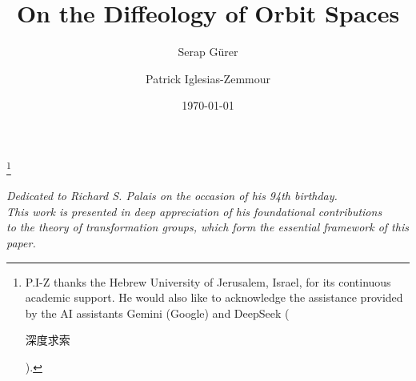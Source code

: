 \documentclass[10pt,reqno,letterpaper,twoside]{amsart}
\theoremstyle{article}
\begin{document}
  
  \title{On the Diffeology of Orbit Spaces}
  
  
  \author{Serap G{\"u}rer}
  \address{Serap G{\"u}rer,
  Galatasaray University,
  Ortaköy, Çırağan Cd. No:$36$,
  $34349$ Beşiktaş\,/\,İstanbul, Turkey.}
  
  \author{Patrick Iglesias-Zemmour}
  \address{Patrick Iglesias-Zemmour,
  Einstein Institute of Mathematics,
  The Hebrew University of Jerusalem,
  Edmond J. Safra Campus,
  Givat Ram,
  $9190401$ Jerusalem,
  Israel.
  }
  \thanks{P.I-Z thanks the Hebrew University of Jerusalem, Israel, for its continuous academic support.
  He would also like to acknowledge the assistance provided by the AI assistants Gemini (Google) and DeepSeek (\begin{CJK}{UTF8}{gbsn}深度求索\end{CJK}).} %
  
  
  \date{\today}
  
  
  \maketitle
  
  \begin{center}
    \it
    Dedicated to Richard S. Palais on the occasion of his 94th birthday. \\
    This work is presented in deep appreciation of his foundational contributions \\
    to the theory of transformation groups, which form the essential framework of this paper.
  \end{center}
  
  
  
\end{document}
